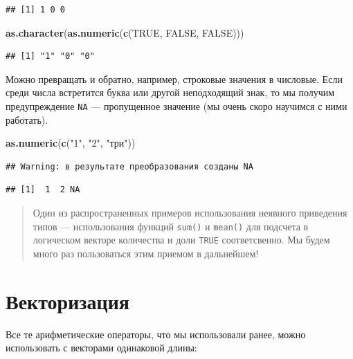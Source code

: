 \documentclass[]{book}
\newenvironment{Shaded}{\begin{snugshade}}{\end{snugshade}}
\newcommand{\KeywordTok}[1]{\textcolor[rgb]{0.13,0.29,0.53}{\textbf{#1}}}
\newcommand{\StringTok}[1]{\textcolor[rgb]{0.31,0.60,0.02}{#1}}
\newcommand{\OtherTok}[1]{\textcolor[rgb]{0.56,0.35,0.01}{#1}}
\newcommand{\NormalTok}[1]{#1}
\begin{document}
\begin{verbatim}
## [1] 1 0 0
\end{verbatim}

\begin{Shaded}
\begin{Highlighting}[]
\KeywordTok{as.character}\NormalTok{(}\KeywordTok{as.numeric}\NormalTok{(}\KeywordTok{c}\NormalTok{(}\OtherTok{TRUE}\NormalTok{, }\OtherTok{FALSE}\NormalTok{, }\OtherTok{FALSE}\NormalTok{)))}
\end{Highlighting}
\end{Shaded}

\begin{verbatim}
## [1] "1" "0" "0"
\end{verbatim}

Можно превращать и обратно, например, строковые значения в числовые.
Если среди числа встретится буква или другой неподходящий знак, то мы
получим предупреждение \texttt{NA} --- пропущенное значение (мы очень
скоро научимся с ними работать).

\begin{Shaded}
\begin{Highlighting}[]
\KeywordTok{as.numeric}\NormalTok{(}\KeywordTok{c}\NormalTok{(}\StringTok{"1"}\NormalTok{, }\StringTok{"2"}\NormalTok{, }\StringTok{"три"}\NormalTok{))}
\end{Highlighting}
\end{Shaded}

\begin{verbatim}
## Warning: в результате преобразования созданы NA
\end{verbatim}

\begin{verbatim}
## [1]  1  2 NA
\end{verbatim}

\begin{quote}
Один из распространенных примеров использования неявного приведения
типов --- использования функций \texttt{sum()} и \texttt{mean()} для
подсчета в логическом векторе количества и доли \texttt{TRUE}
соответсвенно. Мы будем много раз пользоваться этим приемом в
дальнейшем!
\end{quote}

\section{Векторизация}\label{vector_op}

Все те арифметические операторы, что мы использовали ранее, можно
использовать с векторами одинаковой длины:
\end{document}
